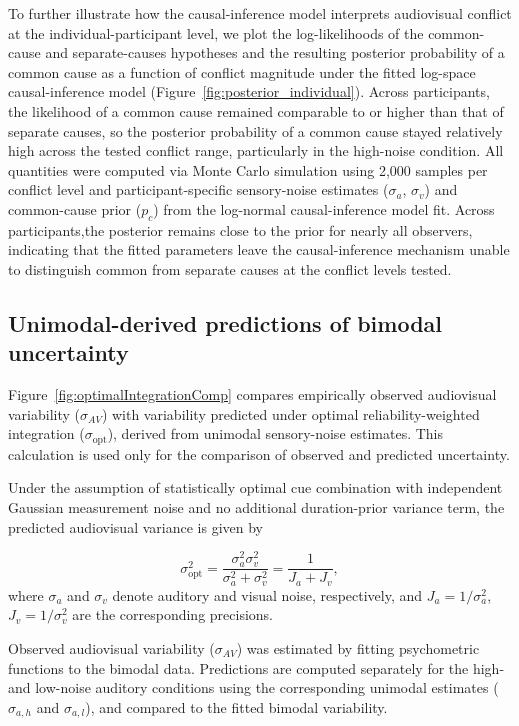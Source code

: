 \documentclass{jov}
\begin{document}
To further illustrate how the causal-inference model interprets audiovisual conflict at the individual-participant level, we plot the log-likelihoods of the common-cause and separate-causes hypotheses and the resulting posterior probability of a common cause as a function of conflict magnitude under the fitted log-space causal-inference model (Figure~\ref{fig:posterior_individual}). Across participants, the likelihood of a common cause remained comparable to or higher than that of separate causes, so the posterior probability of a common cause stayed relatively high across the tested conflict range, particularly in the high-noise condition. All quantities were computed via Monte Carlo simulation using 2,000 samples per conflict level and participant-specific sensory-noise estimates ($\sigma_a$, $\sigma_v$) and common-cause prior ($p_c$) from the log-normal causal-inference model fit. Across participants,the posterior remains close to the prior for nearly all observers, indicating that the fitted parameters leave the causal-inference mechanism unable to distinguish common from separate causes at the conflict levels tested.


\subsection{Unimodal-derived predictions of bimodal uncertainty}

Figure~\ref{fig:optimalIntegrationComp} compares empirically observed audiovisual variability ($\sigma_{AV}$) with variability predicted under optimal reliability-weighted integration ($\sigma_{\mathrm{opt}}$), derived from unimodal sensory-noise estimates. This calculation is used only for the comparison of observed and predicted uncertainty.

Under the assumption of statistically optimal cue combination with independent Gaussian measurement noise and no additional duration-prior variance term, the predicted audiovisual variance is given by

\begin{equation}
\sigma_{\mathrm{opt}}^2 = \frac{\sigma_a^2 \sigma_v^2}{\sigma_a^2 + \sigma_v^2}
= \frac{1}{J_a + J_v},
\end{equation}
where $\sigma_a$ and $\sigma_v$ denote auditory and visual noise, respectively, and $J_a = 1/\sigma_a^2$, $J_v = 1/\sigma_v^2$ are the corresponding precisions.

Observed audiovisual variability ($\sigma_{AV}$) was estimated by fitting psychometric functions to the bimodal data. Predictions are computed separately for the high- and low-noise auditory conditions using the corresponding unimodal estimates ($\sigma_{a,h}$ and $\sigma_{a,l}$), and compared to the fitted bimodal variability.
\end{document}

